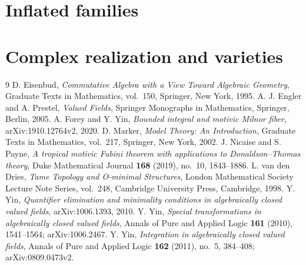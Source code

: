 \documentclass[12pt]{amsart}
\numberwithin{equation}{section}
\theoremstyle{definition}
\theoremstyle{remark}
\begin{document}
\section{Inflated families}
\label{sec:inflated}

\section{Complex realization and varieties}
\label{sec:complex}


\begin{thebibliography}{9}
D. Eisenbud, \emph{Commutative Algebra with a View Toward Algebraic Geometry},
Graduate Texts in Mathematics, vol.~150, Springer, New York, 1995.
A. J. Engler and A. Prestel, \emph{Valued Fields},
Springer Monographs in Mathematics, Springer, Berlin, 2005.
A. Forey and Y. Yin,
\emph{Bounded integral and motivic Milnor fiber},
arXiv:1910.12764v2, 2020.
D. Marker, \emph{Model Theory: An Introduction},
Graduate Texts in Mathematics, vol.~217, Springer, New York, 2002.
J. Nicaise and S. Payne, \emph{A tropical motivic Fubini theorem with
applications to Donaldson--Thomas theory},
Duke Mathematical Journal \textbf{168} (2019), no.~10, 1843--1886.
L. van den Dries, \emph{Tame Topology and O-minimal Structures},
London Mathematical Society Lecture Note Series, vol.~248,
Cambridge University Press, Cambridge, 1998.
Y. Yin, \emph{Quantifier elimination and minimality conditions in
algebraically closed valued fields}, arXiv:1006.1393, 2010.
Y. Yin, \emph{Special transformations in algebraically closed valued fields},
Annals of Pure and Applied Logic \textbf{161} (2010), 1541--1564;
arXiv:1006.2467.
Y. Yin, \emph{Integration in algebraically closed valued fields},
Annals of Pure and Applied Logic \textbf{162} (2011), no.~5, 384--408;
arXiv:0809.0473v2.
\end{thebibliography}
\end{document}
